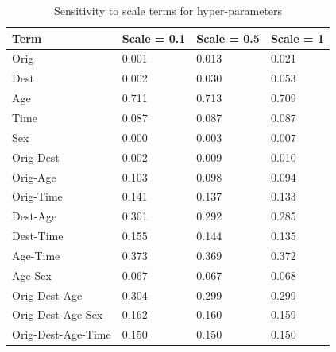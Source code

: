 \begin{table}[ht]
\centering
\caption{Sensitivity to scale terms for hyper-parameters} 
\label{tab:sensitivity}
\begin{tabular}{lp{3.3cm}p{3.3cm}p{3.3cm}}
  \hline
Term & Scale = 0.1 & Scale = 0.5 & Scale = 1 \\ 
  \hline
Orig & 0.001 & 0.013 & 0.021 \\ 
  Dest & 0.002 & 0.030 & 0.053 \\ 
  Age & 0.711 & 0.713 & 0.709 \\ 
  Time & 0.087 & 0.087 & 0.087 \\ 
  Sex & 0.000 & 0.003 & 0.007 \\ 
  Orig-Dest & 0.002 & 0.009 & 0.010 \\ 
  Orig-Age & 0.103 & 0.098 & 0.094 \\ 
  Orig-Time & 0.141 & 0.137 & 0.133 \\ 
  Dest-Age & 0.301 & 0.292 & 0.285 \\ 
  Dest-Time & 0.155 & 0.144 & 0.135 \\ 
  Age-Time & 0.373 & 0.369 & 0.372 \\ 
  Age-Sex & 0.067 & 0.067 & 0.068 \\ 
  Orig-Dest-Age & 0.304 & 0.299 & 0.299 \\ 
  Orig-Dest-Age-Sex & 0.162 & 0.160 & 0.159 \\ 
  Orig-Dest-Age-Time & 0.150 & 0.150 & 0.150 \\ 
   \hline
\end{tabular}
\end{table}
